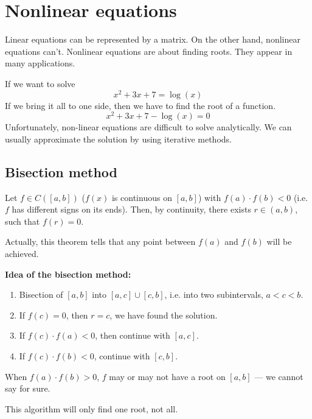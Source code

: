 
\pagebreak
\section{Nonlinear equations}
Linear equations can be represented by a matrix. On the other hand, nonlinear equations can't.
Nonlinear equations are about finding roots. They appear in many applications.

\begin{example}
    If we want to solve
    \[ x^2 + 3x + 7 = \log(x) \]
    If we bring it all to one side, then we have to find the root of a function.
    \[ x^2 + 3x + 7 - \log(x) = 0 \]
    Unfortunately, non-linear equations are difficult to solve analytically.
    We can usually approximate the solution by using iterative methods.
\end{example}

\subsection{Bisection method}
\begin{theorem}
    Let $f \in C([a, b])$ ($f(x)$ is continuous on $[a, b]$)
    with $f(a) \cdot f(b) < 0$ (i.e. $f$ has different signs on its ends).
    Then, by continuity, there exists $r \in (a, b)$, such that
    $f(r) = 0$.
\end{theorem}
\begin{remark}
    Actually, this theorem tells that any point between $f(a)$ and $f(b)$ will be achieved.
\end{remark}

\textbf{Idea of the bisection method:}
\begin{enumerate}
    \item {
        Bisection of $[a, b]$ into $[a, c] \cup [c, b]$, i.e.
        into two subintervals, $a < c < b$.
    }
    \item {
        If $f(c) = 0$, then $r = c$, we have found the solution.
    }
    \item {
        If $f(c) \cdot f(a) < 0$, then continue with $[a, c]$.
    }
    \item {
        If $f(c) \cdot f(b) < 0$, continue with $[c, b]$.
    }
\end{enumerate}
\begin{remark}
    When $f(a) \cdot f(b) > 0$, $f$ may or may not have a root on $[a, b]$ ---
    we cannot say for sure.
\end{remark}
\begin{remark}
    This algorithm will only find one root, not all.
\end{remark}

